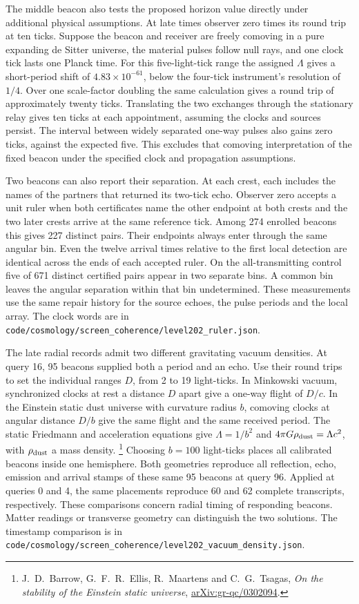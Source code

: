 \documentclass[11pt]{article}
\theoremstyle{remark}
\theoremstyle{plain}
\begin{document}
The middle beacon also tests the proposed horizon value directly under
additional physical assumptions. At late times observer zero times its
round trip at ten ticks. Suppose the beacon and receiver are freely
comoving in a pure expanding de Sitter universe, the material pulses
follow null rays, and one clock tick lasts one Planck time. For this
five-light-tick range the assigned $\Lambda$ gives a short-period
shift of $4.83\times10^{-61}$, below the four-tick instrument's
resolution of $1/4$. Over one scale-factor doubling the same calculation
gives a round trip of approximately twenty ticks. Translating the
two exchanges through the stationary relay gives ten ticks at each
appointment, assuming the clocks and sources persist. The interval
between widely separated one-way pulses also gains zero ticks, against
the expected five. This excludes that comoving interpretation of the
fixed beacon under the specified clock and propagation assumptions.

Two beacons can also report their separation. At each crest, each
includes the names of the partners that returned its two-tick echo.
Observer zero accepts a unit ruler when both certificates name the
other endpoint at both crests and the two later crests arrive at the
same reference tick. Among 274 enrolled beacons this gives 227 distinct
pairs. Their endpoints always enter through the same angular bin.
Even the twelve arrival times relative to the first local detection
are identical across the ends of each accepted ruler. On the
all-transmitting control five of 671 distinct certified pairs appear
in two separate bins. A common bin leaves the angular separation
within that bin undetermined. These measurements use the same repair
history for the source echoes, the pulse periods and the local array.
The clock words are in
\nolinkurl{code/cosmology/screen_coherence/level202_ruler.json}.

The late radial records admit two different gravitating vacuum densities.
At query 16, 95 beacons supplied both a period and an echo. Use their
round trips to set the individual ranges $D$, from 2 to 19 light-ticks.
In Minkowski vacuum, synchronized clocks at rest a distance $D$ apart
give a one-way flight of $D/c$. In the Einstein static dust universe
with curvature radius $b$, comoving clocks at angular distance $D/b$
give the same flight and the same received period. The static Friedmann
and acceleration equations give $\Lambda=1/b^2$ and
$4\pi G\rho_{\rm dust}=\Lambda c^2$, with $\rho_{\rm dust}$ a mass density.%
\footnote{J.~D.~Barrow, G.~F.~R.~Ellis, R.~Maartens and C.~G.~Tsagas,
\emph{On the stability of the Einstein static universe},
\href{https://arxiv.org/abs/gr-qc/0302094}{arXiv:gr-qc/0302094}.}
Choosing $b=100$ light-ticks places all calibrated beacons inside one
hemisphere. Both geometries reproduce all reflection, echo, emission
and arrival stamps of these same 95 beacons at query 96. Applied at
queries 0 and 4, the same placements reproduce 60 and 62 complete
transcripts, respectively. These comparisons concern radial timing of
responding beacons. Matter readings or transverse geometry can
distinguish the two solutions. The timestamp comparison is in
\nolinkurl{code/cosmology/screen_coherence/level202_vacuum_density.json}.
\end{document}

